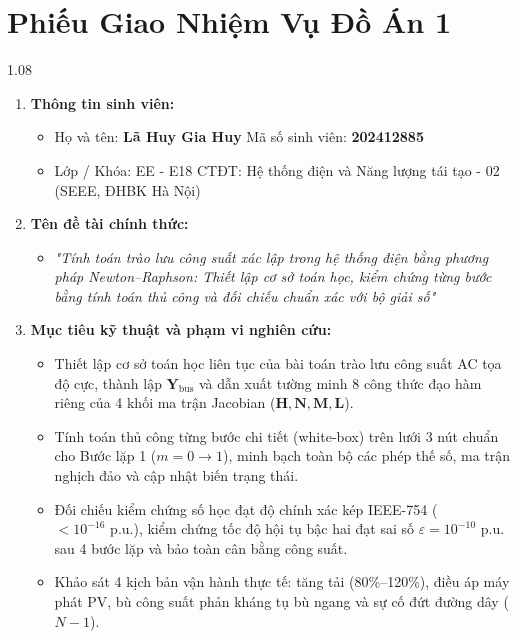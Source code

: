 \documentclass[12pt,a4paper,oneside]{report}
\begin{document}
\chapter*{Phiếu Giao Nhiệm Vụ Đồ Án 1}

\begin{spacing}{1.08}
\begin{enumerate}\setlength{\itemsep}{1pt}\setlength{\parskip}{0pt}
    \item \textbf{Thông tin sinh viên:}
    \begin{itemize}\setlength{\itemsep}{0pt}\setlength{\parskip}{0pt}
        \item Họ và tên: \textbf{Lã Huy Gia Huy} \quad Mã số sinh viên: \textbf{202412885}
        \item Lớp / Khóa: EE - E18 \quad CTĐT: Hệ thống điện và Năng lượng tái tạo - 02 (SEEE, ĐHBK Hà Nội)
    \end{itemize}
    \item \textbf{Tên đề tài chính thức:}
    \begin{itemize}\setlength{\itemsep}{0pt}\setlength{\parskip}{0pt}
        \item \textit{"Tính toán trào lưu công suất xác lập trong hệ thống điện bằng phương pháp Newton--Raphson: Thiết lập cơ sở toán học, kiểm chứng từng bước bằng tính toán thủ công và đối chiếu chuẩn xác với bộ giải số"}
    \end{itemize}
    \item \textbf{Mục tiêu kỹ thuật và phạm vi nghiên cứu:}
    \begin{itemize}\setlength{\itemsep}{0pt}\setlength{\parskip}{0pt}
        \item Thiết lập cơ sở toán học liên tục của bài toán trào lưu công suất AC tọa độ cực, thành lập $\mathbf{Y}_{\text{bus}}$ và dẫn xuất tường minh 8 công thức đạo hàm riêng của 4 khối ma trận Jacobian ($\mathbf{H}, \mathbf{N}, \mathbf{M}, \mathbf{L}$).
        \item Tính toán thủ công từng bước chi tiết (white-box) trên lưới 3 nút chuẩn cho Bước lặp 1 ($m = 0 \to 1$), minh bạch toàn bộ các phép thế số, ma trận nghịch đảo và cập nhật biến trạng thái.
        \item Đối chiếu kiểm chứng số học đạt độ chính xác kép IEEE-754 ($< 10^{-16}\text{ p.u.}$), kiểm chứng tốc độ hội tụ bậc hai đạt sai số $\varepsilon = 10^{-10}\text{ p.u.}$ sau 4 bước lặp và bảo toàn cân bằng công suất.
        \item Khảo sát 4 kịch bản vận hành thực tế: tăng tải (80\%--120\%), điều áp máy phát PV, bù công suất phản kháng tụ bù ngang và sự cố đứt đường dây ($N-1$).

\end{itemize}
\end{enumerate}
\end{spacing}
\end{document}
